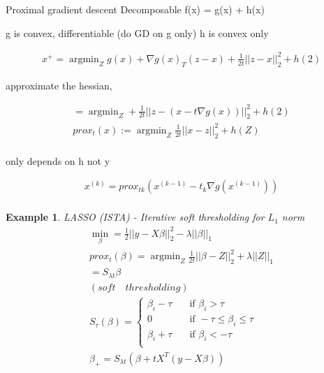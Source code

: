 \documentclass[10pt]{article}
\newtheorem{example}[ex]{Example}
\DeclareMathOperator*{\argmin}{argmin}
\begin{document}
Proximal gradient descent
Decomposable f(x) = g(x) + h(x)

g is convex, differentiable (do GD on g only)
h is convex only 

\begin{equation}
\begin{aligned}
x^{+} = \argmin_Z g(x) + \nabla g(x)_T(z-x) + \frac{1}{2t}||z-x||_2^2 + h(2)
\end{aligned}
\end{equation}

approximate the hessian,

\begin{equation}
\begin{aligned}
 	= \argmin_Z + \frac{1}{2t}||z-(x - t\nabla g(x))||_2^2 + h(2) \\
	prox_t(x) := \argmin_Z \frac{1}{2t}||x-z||_2^2 + h(Z) \\
\end{aligned}
\end{equation}

only depends on h not y

\begin{equation}
\begin{aligned}
	x^(k) = prox_{tk}(x^(k-1) - t_k\nabla g(x^(k-1))) \\
\end{aligned}
\end{equation}

\begin{example} 
LASSO (ISTA) - 
Iterative soft thresholding for $L_1$ norm
\begin{equation}
\begin{aligned}
	\min_{\beta} = \frac{1}{2} ||y-X\beta||_2^2 - \lambda ||\beta||_1 \\
	prox_{t}(\beta) = \argmin_Z \frac{1}{2t}||\beta - Z||_2^2 + \lambda||Z||_1 \\
 					= S_{\lambda t}{\beta} \\
					(soft\quad thresholding) \\
    S_{\tau}(\beta) =
  	\begin{cases}
    	\beta_i - \tau       & \quad \text{if } \beta_i > \tau\\
    	0		             & \quad \text{if } -\tau \leq \beta_i \leq \tau\\
        \beta_i + \tau       & \quad \text{if } \beta_i < -\tau\\
  	\end{cases}
    \\
	\beta_{+} = S_{\lambda t}(\beta + tX^T(y-X\beta)) \\
\end{aligned}
\end{equation}

\end{example}
\end{document}
